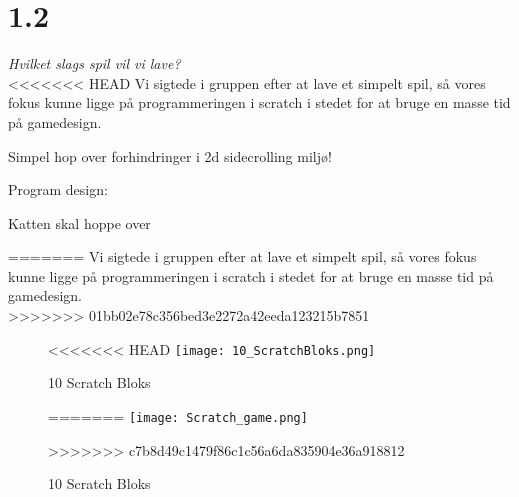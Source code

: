 \section{1.2}

\textit{Hvilket slags spil vil vi lave?}\\
<<<<<<< HEAD
Vi sigtede i gruppen efter at lave et simpelt spil, så vores fokus kunne ligge på programmeringen i scratch i stedet for at bruge en masse tid på gamedesign.

Simpel hop over forhindringer i 2d sidecrolling miljø!

Program design:

Katten skal hoppe over 

=======
Vi sigtede i gruppen efter at lave et simpelt spil,
så vores fokus kunne ligge på programmeringen i scratch
i stedet for at bruge en masse tid på gamedesign.\\
>>>>>>> 01bb02e78c356bed3e2272a42eeda123215b7851

\begin{figure}[ht]
	\centering
<<<<<<< HEAD
	\texttt{[image: 10\_ScratchBloks.png]}
	\caption{{10 Scratch Bloks}}
	\label{fig:10Bloks}
=======
	\texttt{[image: Scratch\_game.png]}
	\caption{{10 Scratch Bloks}}
	\label{fig:Version_0.1}
>>>>>>> c7b8d49c1479f86c1c56a6da835904e36a918812
\end{figure}
